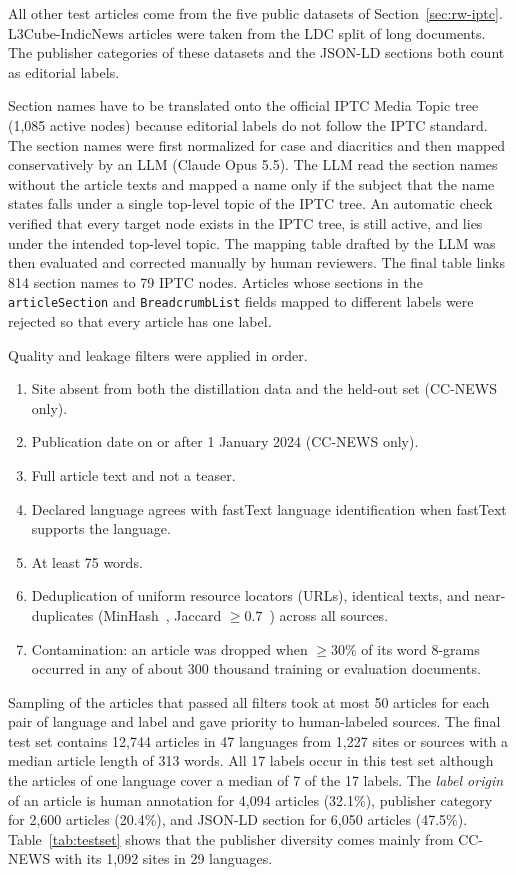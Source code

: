 \documentclass{ieeeaccess}
\begin{document}
All other test articles come from the five public datasets of Section~\ref{sec:rw-iptc}. L3Cube-IndicNews articles were taken from the LDC split of long documents. The publisher categories of these datasets and the JSON-LD sections both count as editorial labels.

Section names have to be translated onto the official IPTC Media Topic tree (1,085 active nodes) because editorial labels do not follow the IPTC standard. The section names were first normalized for case and diacritics and then mapped conservatively by an LLM (Claude Opus 5.5). The LLM read the section names without the article texts and mapped a name only if the subject that the name states falls under a single top-level topic of the IPTC tree. An automatic check verified that every target node exists in the IPTC tree, is still active, and lies under the intended top-level topic. The mapping table drafted by the LLM was then evaluated and corrected manually by human reviewers. The final table links 814 section names to 79 IPTC nodes. Articles whose sections in the \texttt{articleSection} and \texttt{BreadcrumbList} fields mapped to different labels were rejected so that every article has one label.

Quality and leakage filters were applied in order.
\begin{enumerate}
  \item Site absent from both the distillation data and the held-out set (CC-NEWS only).
  \item Publication date on or after 1 January 2024 (CC-NEWS only).
  \item Full article text and not a teaser.
  \item Declared language agrees with fastText language identification when fastText supports the language.
  \item At least 75 words.
  \item Deduplication of uniform resource locators (URLs), identical texts, and near-duplicates (MinHash~\cite{broder1997resemblance}, Jaccard $\ge 0.7$~\cite{lee2022dedup}) across all sources.
  \item Contamination: an article was dropped when $\ge 30\%$ of its word 8-grams occurred in any of about 300 thousand training or evaluation documents.
\end{enumerate}

Sampling of the articles that passed all filters took at most 50 articles for each pair of language and label and gave priority to human-labeled sources. The final test set contains 12,744 articles in 47 languages from 1,227 sites or sources with a median article length of 313 words. All 17 labels occur in this test set although the articles of one language cover a median of 7 of the 17 labels. The \emph{label origin} of an article is human annotation for 4,094 articles (32.1\%), publisher category for 2,600 articles (20.4\%), and JSON-LD section for 6,050 articles (47.5\%). Table~\ref{tab:testset} shows that the publisher diversity comes mainly from CC-NEWS with its 1,092 sites in 29 languages.
\end{document}
